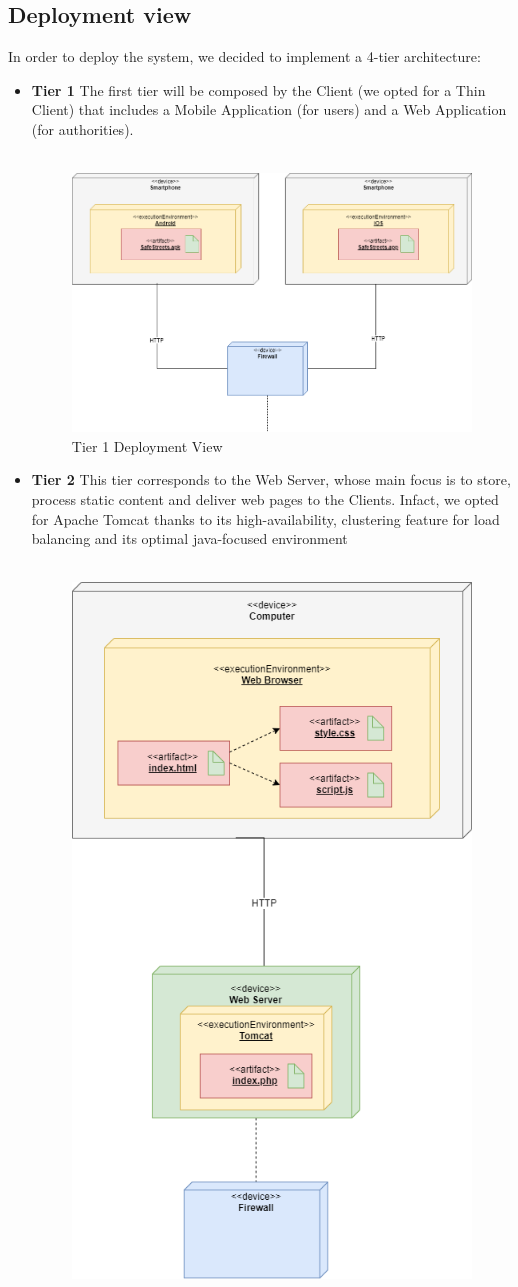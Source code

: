 \documentclass[12pt,a4paper]{article}
\begin{document}
\subsection{Deployment view}
In order to deploy the system, we decided to implement a 4-tier architecture:
\begin{itemize}
\item \textbf{Tier 1}
The first tier will be composed by the Client (we opted for a Thin Client) that includes a Mobile Application (for users) and a Web Application (for authorities).\\\\
\begin{figure}[H]
		\centering
		\includegraphics[width=1.0\linewidth]{../assets/images/MOBILE APPLICATION COMP VIEW.png}
		\caption{Tier 1 Deployment View}
	\end{figure}
\newpage
\item \textbf{Tier 2}
This tier corresponds to the Web Server, whose main focus is to store, process static content and deliver web pages to the Clients. Infact, we opted for Apache Tomcat thanks to its high-availability, clustering feature for load balancing and its optimal java-focused environment\\\\
\begin{figure}[H]
		\centering
		\includegraphics[width=0.5\linewidth]{../assets/images/tier1_tier2.png}

\end{figure}
\end{itemize}
\end{document}
